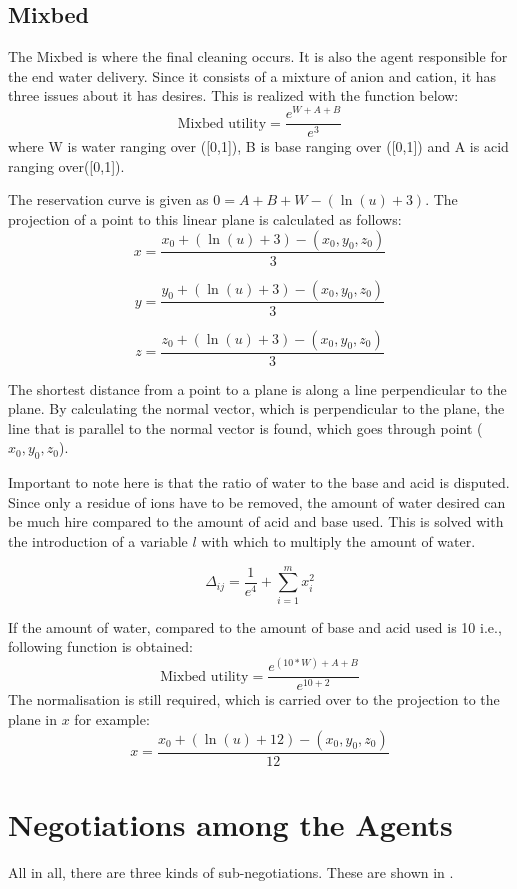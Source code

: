 \subsection{Mixbed}
\label{sec:des:mixb}
The Mixbed is where the final cleaning occurs. It is also the agent responsible for the end water delivery. Since it consists of a mixture of anion and cation, it has three issues about it has desires. This is realized with the function below:
\[
\text{Mixbed utility} = \frac{e^{W+A+B}}{e^3}
\] 
where W is water ranging over ([0,1]), B is base ranging over ([0,1]) and A is acid ranging over([0,1]).

The reservation curve is given as $0 = A+B+W - (\ln(u)+3)  $. The projection of a point to this linear plane is calculated as follows:
\[
x = \frac{x_0 + (\ln(u)+3) - (x_0, y_0, z_0)}{3}
\]

\[
y = \frac{y_0 + (\ln(u)+3) - (x_0, y_0, z_0)}{3} 
\]

\[
z = \frac{z_0 + (\ln(u)+3) - (x_0, y_0, z_0)}{3}
\]

The shortest distance from a point to a plane is along a line perpendicular to the plane. By calculating the normal vector, which is perpendicular to the plane, the line that is parallel to the normal vector is found, which goes through point ($x_0, y_0, z_0$). 

Important to note here is that the ratio of water to the base and acid is disputed. Since only a residue of ions have to be removed, the amount of water desired can be much hire compared to the amount of acid and base used. This is solved with the introduction of a variable $l$ with which to multiply the amount of water. 

\[ \Delta_{ij} = \frac{1}{e^4} +\sum_{i=1}^m x^2_i \]

If the amount of water, compared to the amount of base and acid used is 10 i.e., following function is obtained:
 \[
 \text{Mixbed utility} = \frac{e^{(10*W)+A+B}}{e^{10+2}}
 \] 
The normalisation is still required, which is carried over to the projection to the plane in $x$ for example:
\[
x = \frac{x_0 + (\ln(u)+12) - (x_0, y_0, z_0)}{12}
\]
\section{Negotiations among the Agents}
All in all, there are three kinds of sub-negotiations. These are shown in .

